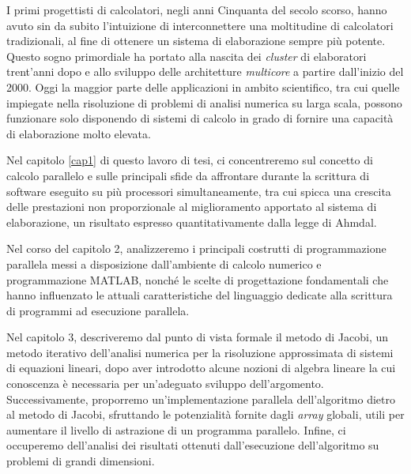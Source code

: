I primi progettisti di calcolatori, negli anni Cinquanta del secolo scorso, hanno avuto sin da subito l'intuizione di interconnettere
una moltitudine di calcolatori tradizionali, al fine di ottenere un sistema di elaborazione sempre più potente.\newline
Questo sogno primordiale ha portato alla nascita dei \textit{cluster} di elaboratori trent'anni dopo e allo sviluppo delle architetture
\textit{multicore} a partire dall'inizio del 2000.\newline
Oggi la maggior parte delle applicazioni in ambito scientifico, tra cui quelle impiegate nella risoluzione di problemi di analisi numerica
su larga scala, possono funzionare solo disponendo di sistemi di calcolo in grado di fornire una capacità di elaborazione molto elevata.

Nel capitolo \ref{cap1} di questo lavoro di tesi, ci concentreremo sul concetto di calcolo parallelo e sulle principali sfide da affrontare
durante la scrittura di software eseguito su più processori simultaneamente, tra cui spicca una crescita delle prestazioni non proporzionale
al miglioramento apportato al sistema di elaborazione, un risultato espresso quantitativamente dalla legge di Ahmdal.

Nel corso del capitolo 2, analizzeremo i principali costrutti di programmazione parallela messi a disposizione dall’ambiente di calcolo numerico
e programmazione MATLAB\textsuperscript{\textregistered}, nonché le scelte di progettazione fondamentali che hanno influenzato
le attuali caratteristiche del linguaggio dedicate alla scrittura di programmi ad esecuzione parallela.

Nel capitolo 3, descriveremo dal punto di vista formale il metodo di Jacobi, un metodo iterativo dell’analisi numerica per la risoluzione
approssimata di sistemi di equazioni lineari, dopo aver introdotto alcune nozioni di algebra lineare la cui conoscenza è necessaria per un'adeguato
sviluppo dell'argomento.\newline
Successivamente, proporremo un’implementazione parallela dell'algoritmo dietro al metodo di Jacobi, sfruttando le potenzialità fornite
dagli \textit{array} globali, utili per aumentare il livello di astrazione di un programma parallelo.\newline
Infine, ci occuperemo dell’analisi dei risultati ottenuti dall’esecuzione dell’algoritmo su problemi di grandi dimensioni.
